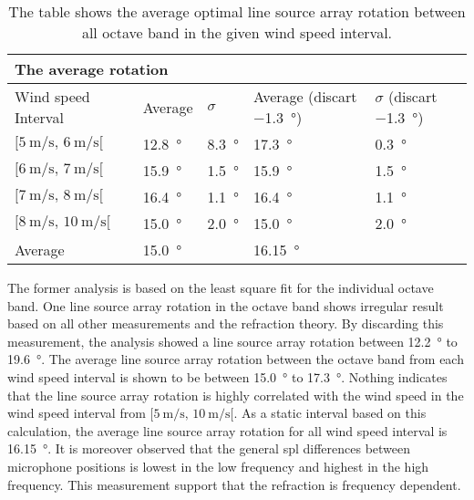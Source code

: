   \begin{table}[H]
 \centering
  \caption{The table shows the average optimal line source array rotation between all octave band in the given wind speed interval.}
\begin{tabular}{l|l|l|l|l}
\multicolumn{2}{l}{The average rotation}      \\ \hline
Wind speed Interval & Average  & $\sigma$ & Average (discart  \SI{-1.3}{\degree}) & $\sigma$ (discart  \SI{-1.3}{\degree}) \\ \hline
  $[\SI{5}{\meter\per\second},\, \SI{6}{\meter\per\second}[ $       &   \SI{12.8}{\degree}  &   \SI{8.3}{\degree}  &   \SI{17.3}{\degree}   &   \SI{0.3}{\degree}\\
    $[\SI{6}{\meter\per\second},\, \SI{7}{\meter\per\second}[ $     &   \SI{15.9}{\degree}   &   \SI{1.5}{\degree} &   \SI{15.9}{\degree}   &   \SI{1.5}{\degree}\\
  $[\SI{7}{\meter\per\second},\, \SI{8}{\meter\per\second}[ $       &    \SI{16.4}{\degree}  &   \SI{1.1}{\degree} &    \SI{16.4}{\degree}&    \SI{1.1}{\degree}  \\
   $[\SI{8}{\meter\per\second},\, \SI{10}{\meter\per\second}[ $      &     \SI{15.0}{\degree}  &   \SI{2.0}{\degree} &     \SI{15.0}{\degree} &     \SI{2.0}{\degree} \\ \hline
    Average      &     \SI{15.0}{\degree} &  &\SI{16.15}{\degree}&
\end{tabular}
\label{res:tab:cross_mean}
\end{table}  
 
The former analysis is based on the least square fit for the individual octave band. One line source array rotation in the  octave band shows irregular result based on all other measurements and the refraction theory. By discarding this measurement, the analysis showed a line source array rotation between  \SI{12.2}{\degree} to  \SI{19.6}{\degree}. The average line source array rotation between the octave band from each wind speed interval is shown to be between \SI{15.0}{\degree} to \SI{17.3}{\degree}. Nothing indicates that the line source array rotation is highly correlated with the wind speed in the  wind speed interval from $[\SI{5}{\meter\per\second},\, \SI{10}{\meter\per\second}[ $. As a static interval based on this calculation, the average line source array rotation for all wind speed interval is \SI{16.15}{\degree}. It is moreover observed that the general \gls{spl} differences between microphone positions is lowest in the low frequency and highest in the high frequency. This measurement support that the refraction is frequency dependent.



